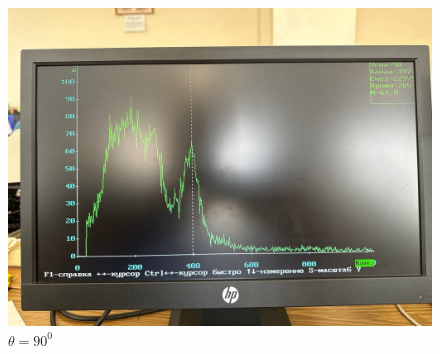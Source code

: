 \documentclass[a4paper, 12pt]{article}
\begin{document}
\begin{figure}[H]
\begin{minipage}[h]{0.3\linewidth}
        \includegraphics[width = 1\linewidth]{res/010.jpg}
        \caption{$\theta = 90^0$}
    \end{minipage}
    \end{figure}
    
\end{document}
